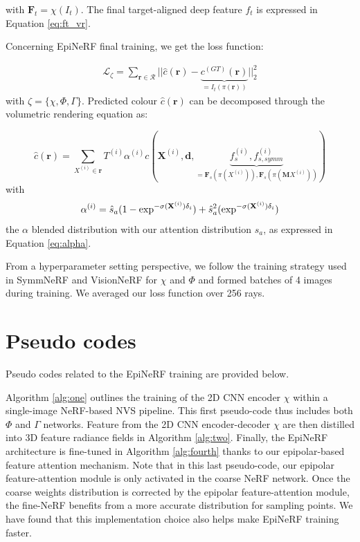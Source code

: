 with $\mathbf{F}_{t} = \chi(I_{t})$. The final target-aligned deep feature $f_{t}$ is expressed in Equation \ref{eq:ft_vr}. \newline

Concerning EpiNeRF final training, we get the loss function: 

\begin{equation}
\begin{split}
 \mathcal{L}_{\zeta}= \sum_{\mathbf{r}\in\mathcal{R}} || \hat{c}(\mathbf{r}) - \underbrace{c^{(GT)}(\mathbf{r})}_{= I_{t}(\pi(\mathbf{r}))} ||_{2}^{2}
\end{split}
\end{equation}
with $\zeta = \{\chi,\Phi,\Gamma\}$. Predicted colour $\hat{c}(\mathbf{r})$ can be decomposed through the volumetric rendering equation as: 

\begin{equation}
\hat{c}(\mathbf{r}) = \sum_{X^{(i)} \in \mathbf{r}}T^{(i)}\alpha^{(i)}c(\mathbf{X}^{(i)},\mathbf{d},\underbrace{f_{s}^{(i)},f_{s,symm}^{(i)}}_{= \mathbf{F}_{s}(\pi(X^{(i)})), \mathbf{F}_{s}(\pi(\mathbf{M}X^{(i)}))})
\end{equation}
with
\begin{equation}
\alpha^{(i)} = \hat{s}_{a}(1-\exp^{-\sigma(\mathbf{X}^{(i)})\delta_{i}}) + \hat{s}_{a}^{2}(\exp^{-\sigma(\mathbf{X}^{(i)})\delta_{i}}) \\
\end{equation}
the $\alpha$ blended distribution with our attention distribution $\hat{s}_{a}$, as expressed in Equation \ref{eq:alpha}. 

From a hyperparameter setting perspective, we follow the training strategy used in  SymmNeRF \citep{li2022symmnerf} and VisionNeRF \citep{lin2023vision} for $\chi$ and $\Phi$ and formed batches of 4 images during training. We averaged our loss function over 256 rays.

\section{Pseudo codes}

Pseudo codes related to the EpiNeRF training are provided below. 

Algorithm \ref{alg:one} outlines the training of the 2D \ac{CNN} encoder $\chi$ within a single-image \ac{NeRF}-based \ac{NVS} pipeline. This first pseudo-code thus includes both $\Phi$ and $\Gamma$ networks. Feature from the 2D \ac{CNN} encoder-decoder $\chi$ are then distilled into 3D feature radiance fields in Algorithm \ref{alg:two}. Finally, the EpiNeRF architecture is fine-tuned in Algorithm \ref{alg:fourth} thanks to our epipolar-based feature attention mechanism. Note that in this last pseudo-code, our epipolar feature-attention module is only activated in the coarse NeRF network. Once the coarse weights distribution is corrected by the epipolar feature-attention module, the fine-NeRF benefits from a more accurate distribution for sampling points. We have found that this implementation choice also helps make EpiNeRF training faster.

